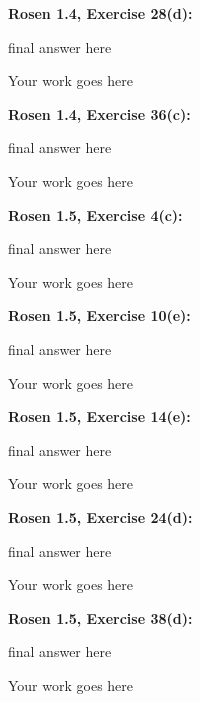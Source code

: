 \documentclass[10pt]{article}
\begin{document}
\noindent
{\bf Rosen 1.4, Exercise 28(d):}  \\

\begin{framed}
final answer here
\end{framed}

\vspace*{1cm}
\noindent
Your work goes here


\newpage





\noindent
{\bf Rosen 1.4, Exercise 36(c):}  \\

\begin{framed}
final answer here
\end{framed}

\vspace*{1cm}
\noindent
Your work goes here


\newpage




\noindent
{\bf Rosen 1.5, Exercise 4(c):}  \\

\begin{framed}
final answer here
\end{framed}

\vspace*{1cm}
\noindent
Your work goes here


\newpage





\noindent
{\bf Rosen 1.5, Exercise 10(e):}  \\

\begin{framed}
final answer here
\end{framed}

\vspace*{1cm}
\noindent
Your work goes here


\newpage




\noindent
{\bf Rosen 1.5, Exercise 14(e):}  \\

\begin{framed}
final answer here
\end{framed}

\vspace*{1cm}
\noindent
Your work goes here


\newpage




\noindent
{\bf Rosen 1.5, Exercise 24(d):}  \\

\begin{framed}
final answer here
\end{framed}

\vspace*{1cm}
\noindent
Your work goes here


\newpage




\noindent
{\bf Rosen 1.5, Exercise 38(d):}  \\

\begin{framed}
final answer here
\end{framed}

\vspace*{1cm}
\noindent
Your work goes here
\end{document}
